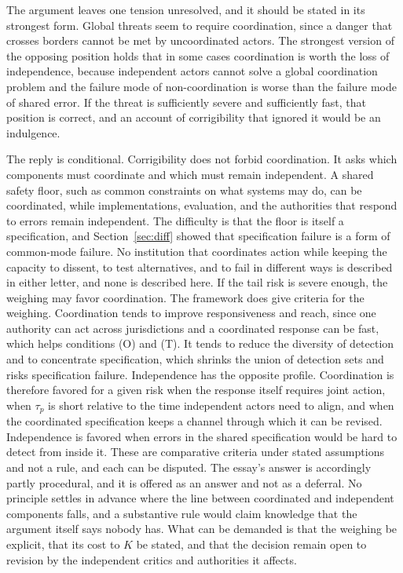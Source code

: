 \documentclass[11pt]{article}
\begin{document}
The argument leaves one tension unresolved, and it should be stated in its strongest form. Global threats seem to require coordination, since a danger that crosses borders cannot be met by uncoordinated actors. The strongest version of the opposing position holds that in some cases coordination is worth the loss of independence, because independent actors cannot solve a global coordination problem and the failure mode of non-coordination is worse than the failure mode of shared error. If the threat is sufficiently severe and sufficiently fast, that position is correct, and an account of corrigibility that ignored it would be an indulgence.

The reply is conditional. Corrigibility does not forbid coordination. It asks which components must coordinate and which must remain independent. A shared safety floor, such as common constraints on what systems may do, can be coordinated, while implementations, evaluation, and the authorities that respond to errors remain independent. The difficulty is that the floor is itself a specification, and Section~\ref{sec:diff} showed that specification failure is a form of common-mode failure. No institution that coordinates action while keeping the capacity to dissent, to test alternatives, and to fail in different ways is described in either letter, and none is described here. If the tail risk is severe enough, the weighing may favor coordination. The framework does give criteria for the weighing. Coordination tends to improve responsiveness and reach, since one authority can act across jurisdictions and a coordinated response can be fast, which helps conditions (O) and (T). It tends to reduce the diversity of detection and to concentrate specification, which shrinks the union of detection sets and risks specification failure. Independence has the opposite profile. Coordination is therefore favored for a given risk when the response itself requires joint action, when $\tau_p$ is short relative to the time independent actors need to align, and when the coordinated specification keeps a channel through which it can be revised. Independence is favored when errors in the shared specification would be hard to detect from inside it. These are comparative criteria under stated assumptions and not a rule, and each can be disputed. The essay's answer is accordingly partly procedural, and it is offered as an answer and not as a deferral. No principle settles in advance where the line between coordinated and independent components falls, and a substantive rule would claim knowledge that the argument itself says nobody has. What can be demanded is that the weighing be explicit, that its cost to $K$ be stated, and that the decision remain open to revision by the independent critics and authorities it affects.
\end{document}
